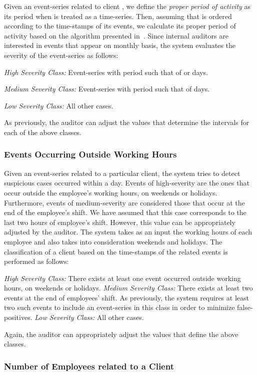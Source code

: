 \documentclass[conference]{IEEEtran}
\begin{document}
Given an event-series  related to client , we define the
\emph{proper period of activity} as its period when  is treated
as a time-series. Then, assuming that  is ordered according to
the time-stamps of its events, we calculate its proper period of
activity based on the algorithm presented in~\cite{AS12}. Since
internal auditors are interested in events that appear on monthly
basis, the system evaluates the severity of the event-series as
follows:

\emph{High Severity Class:} Event-series with period  such that
of  or  days.

\emph{Medium Severity Class:} Event-series with period  such that
of  days.

\emph{Low Severity Class:} All other cases.

As previously, the auditor can adjust the values that determine the
intervals for each of the above classes.

\subsubsection{Events Occurring Outside Working Hours}

Given an event-series related to a particular client, the system
tries to detect suspicious cases occurred within a day. Events of
high-severity are the ones that occur outside the employee's working
hours, on weekends or holidays. Furthermore, events of
medium-severity are considered those that occur at the end of the
employee's shift. We have assumed that this case corresponds to the
last two hours of employee's shift. However, this value can be
appropriately adjusted by the auditor. The system takes as an input
the working hours of each employee and also takes into consideration
weekends and holidays. The classification of a client based on the
time-stamps of the related events is performed as follows:

\emph{High Severity Class: }There exists at least one event
  occurred outside working hours, on weekends or holidays.
\emph{Medium Severity Class: }There exists at least two events at
  the end of employees' shift. As previously, the system requires
  at least two such events to include an event-series in this class in order to minimize false-positives.
\emph{Low Severity Class:} All other cases.

Again, the auditor can appropriately adjust the values that define
the above classes.

\subsubsection{Number of Employees related to a Client}
\end{document}
